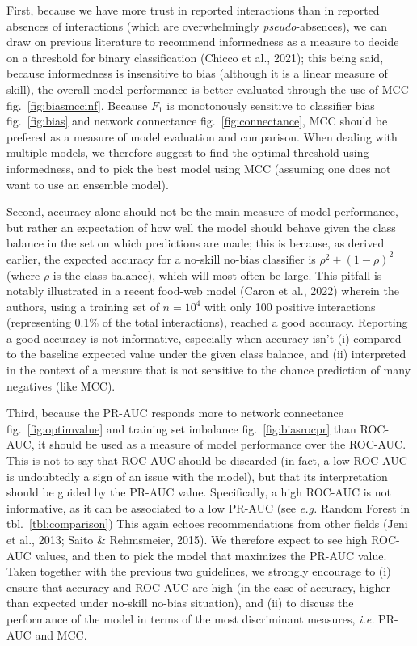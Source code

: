 \documentclass[11pt]{article}
\begin{document}
First, because we have more trust in reported interactions than in
reported absences of interactions (which are overwhelmingly
\emph{pseudo}-absences), we can draw on previous literature to recommend
informedness as a measure to decide on a threshold for binary
classification (Chicco et al., 2021); this being said, because
informedness is insensitive to bias (although it is a linear measure of
skill), the overall model performance is better evaluated through the
use of MCC fig.~\ref{fig:biasmccinf}. Because \(F_1\) is monotonously
sensitive to classifier bias fig.~\ref{fig:bias} and network connectance
fig.~\ref{fig:connectance}, MCC should be prefered as a measure of model
evaluation and comparison. When dealing with multiple models, we
therefore suggest to find the optimal threshold using informedness, and
to pick the best model using MCC (assuming one does not want to use an
ensemble model).

Second, accuracy alone should not be the main measure of model
performance, but rather an expectation of how well the model should
behave given the class balance in the set on which predictions are made;
this is because, as derived earlier, the expected accuracy for a
no-skill no-bias classifier is \(\rho^2 + (1-\rho)^2\) (where \(\rho\)
is the class balance), which will most often be large. This pitfall is
notably illustrated in a recent food-web model (Caron et al., 2022)
wherein the authors, using a training set of \(n = 10^4\) with only 100
positive interactions (representing 0.1\% of the total interactions),
reached a good accuracy. Reporting a good accuracy is not informative,
especially when accuracy isn't (i) compared to the baseline expected
value under the given class balance, and (ii) interpreted in the context
of a measure that is not sensitive to the chance prediction of many
negatives (like MCC).

Third, because the PR-AUC responds more to network connectance
fig.~\ref{fig:optimvalue} and training set imbalance
fig.~\ref{fig:biasrocpr} than ROC-AUC, it should be used as a measure of
model performance over the ROC-AUC. This is not to say that ROC-AUC
should be discarded (in fact, a low ROC-AUC is undoubtedly a sign of an
issue with the model), but that its interpretation should be guided by
the PR-AUC value. Specifically, a high ROC-AUC is not informative, as it
can be associated to a low PR-AUC (see \emph{e.g.} Random Forest in
tbl.~\ref{tbl:comparison}) This again echoes recommendations from other
fields (Jeni et al., 2013; Saito \& Rehmsmeier, 2015). We therefore
expect to see high ROC-AUC values, and then to pick the model that
maximizes the PR-AUC value. Taken together with the previous two
guidelines, we strongly encourage to (i) ensure that accuracy and
ROC-AUC are high (in the case of accuracy, higher than expected under
no-skill no-bias situation), and (ii) to discuss the performance of the
model in terms of the most discriminant measures, \emph{i.e.} PR-AUC and
MCC.
\end{document}
